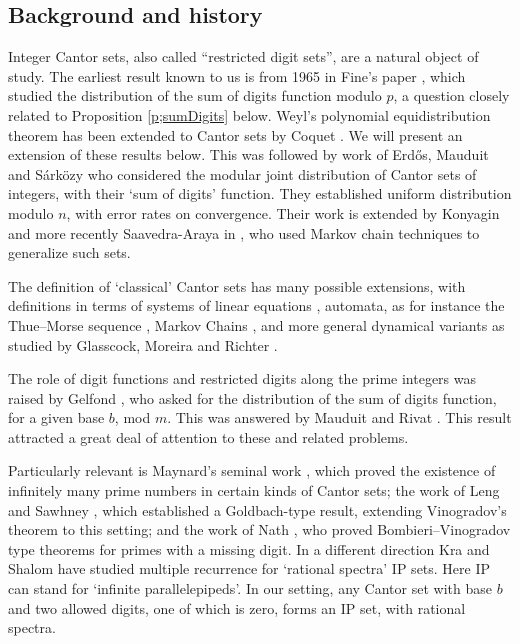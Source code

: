 \subsection{Background and history}\label{sub:history}

Integer Cantor sets, also called ``restricted digit sets'', are a natural object of study.  The earliest result 
known to us is from 
1965 in Fine's paper \cite{MR184895}, which studied the distribution of the sum of digits function modulo $p$, a question closely related to Proposition \ref{p;sumDigits} below. 
Weyl's polynomial equidistribution theorem has been extended to Cantor sets by Coquet  \cites{MR506123,MR578819}. We will present an extension of these results below.  This was followed by work of Erd\H{o}s, Mauduit and S\'{a}rk\"{o}zy \cites{ERDOS199899,MR1692287} who considered the modular joint  distribution of Cantor sets of integers, with their   `sum of digits' function.  They established uniform distribution modulo $n$, with error rates on convergence.  
Their work is extended by 
Konyagin \cite{MR1832701}
and more recently 
Saavedra-Araya in \cite{SAAVEDRA-ARAYA_2026}, who used Markov chain techniques to generalize  such sets.  

The definition of `classical' Cantor sets has many possible extensions, with definitions in terms of systems of linear equations \cites{MR2678855,MR2290789}, 
automata, as for instance the Thue--Morse sequence \cite{MR1830572}, Markov Chains \cite{SAAVEDRA-ARAYA_2026},
and more general dynamical variants 
as studied by 
Glasscock, Moreira and Richter 
\cite{MR4734865}. 
 


The role of digit functions and restricted digits along the prime integers was raised by Gelfond \cite{MR220693}, who asked for the distribution of the sum of digits function, for a given base $b$, mod $m$. This was answered 
by Mauduit and Rivat \cite{MR2680394}.
This result attracted a great deal of attention to these and related problems. 


Particularly relevant is Maynard's seminal work \cite{MaynardInvent2019}, which proved the existence of infinitely many prime numbers in certain kinds of Cantor sets; the work of Leng and Sawhney \cite{leng2024vinogradovstheoremprimesrestricted}, which established a Goldbach-type result, extending Vinogradov's theorem to this setting; and the work of Nath \cite{jlms.12837}, who proved Bombieri--Vinogradov type theorems for primes with a missing digit. 
In a different direction Kra and Shalom \cite{kra2025ergodicaverageslargeintersection}  
have studied multiple recurrence for `rational spectra' IP sets.  Here IP can stand for   `infinite parallelepipeds'.  In our setting, any Cantor set with base $b$ and two allowed digits, one of which is zero, forms an IP set, with rational spectra.   

